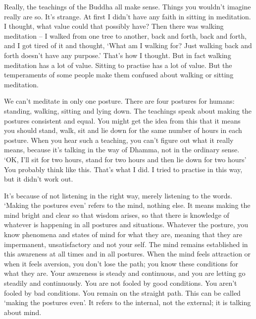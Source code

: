 
Really, the teachings of the Buddha all make sense. Things you wouldn't imagine really are so. It's strange. At first I didn't have any faith in sitting in meditation. I thought, what value could that possibly have? Then there was walking meditation -- I walked from one tree to another, back and forth, back and forth, and I got tired of it and thought, `What am I walking for? Just walking back and forth doesn't have any purpose.' That's how I thought. But in fact walking meditation has a lot of value. Sitting to practise  has a lot of value. But the temperaments of some people make them confused about walking or sitting meditation. 

We can't meditate in only one posture. There are four postures for humans: standing, walking, sitting and lying down. The teachings speak about making the postures consistent and equal. You might get the idea from this that it means you should stand, walk, sit and lie down for the same number of hours in each posture. When you hear such a teaching, you can't figure out what it really means, because it's talking in the way of Dhamma, not in the ordinary sense. `OK, I'll sit for two hours, stand for two hours and then lie down for two hours' You probably think like this. That's what I did. I tried to practise in this way, but it didn't work out. 

It's because of not listening in the right way, merely listening to the words. `Making the postures even' refers to the mind, nothing else. It means making the mind bright and clear so that wisdom arises, so that there is knowledge of whatever is happening in all postures and situations. Whatever the posture, you know phenomena and states of mind for what they are, meaning that they are impermanent, unsatisfactory and not your self. The mind remains established in this awareness at all times and in all postures. When the mind feels attraction or when it feels aversion, you don't lose the path; you know these conditions for what they are. Your awareness is steady and continuous, and you are letting go steadily and continuously. You are not fooled by good conditions. You aren't fooled by bad conditions. You remain on the straight path. This can be called `making the postures even'. It refers to the internal, not the external; it is talking about mind. 

